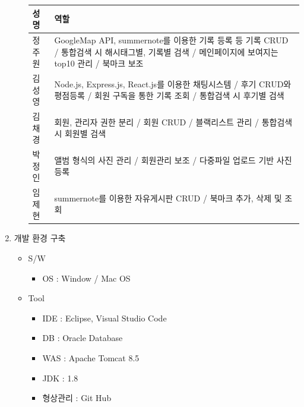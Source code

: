 \begin{enumerate}
\begin{itemize}
            \begin{tabular}{ |p{2cm}|p{12cm}| }
                \hline
                \textbf{성 명} & \textbf{역할} \\
                \hline
                정주원 & GoogleMap API, summernote를 이용한 기록 등록 등 기록 CRUD / 통합검색 시 해시태그별, 기록별 검색 / 메인페이지에 보여지는 top10 관리 / 북마크 보조 \\
                \hline
                김성영 & Node.js, Express.js, React.js를 이용한 채팅시스템 / 후기 CRUD와 평점등록 / 회원 구독을 통한 기록 조회 / 통합검색 시 후기별 검색 \\
                \hline
                김채경 & 회원, 관리자 권한 분리 / 회원 CRUD / 블랙리스트 관리 / 통합검색 시 회원별 검색 \\
                \hline
                박정인 & 앨범 형식의 사진 관리 / 회원관리 보조 / 다중파일 업로드 기반 사진 등록 \\
                \hline
                임제현 & summernote를 이용한 자유게시판 CRUD /  북마크 추가, 삭제 및 조회 \\
                \hline
            \end{tabular}

        \end{itemize}
    \newpage
    \item 개발 환경 구축
    \begin{itemize}
        \item S/W 
            \begin{itemize}
                \item[] OS : Window / Mac OS
            \end{itemize}
        \item Tool
        \begin{itemize}
            \item[] IDE : Eclipse, Visual Studio Code
            \item[] DB : Oracle Database
            \item[] WAS : Apache Tomcat 8.5
            \item[] JDK : 1.8
            \item[] 형상관리 : Git Hub
        \end{itemize}
    \end{itemize}

\end{enumerate}
\par\


